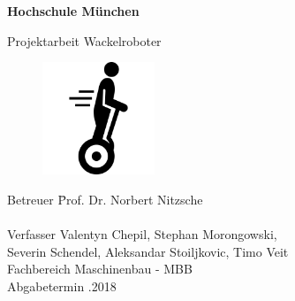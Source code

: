 
\begin{titlepage}
\thispagestyle{empty}
\begin{flushleft}
\begin{Huge}
\textbf{Hochschule München}
\par\medskip
Projektarbeit Wackelroboter
\end{Huge}
\begin{large}
\par\vspace{5cm}
\begin{figure}[h]
\centering\includegraphics[width=0.3\textwidth]{images/segwayIcon.png}

\end{figure}

\par\vspace{5cm}

\begin{large}
\begin{tabbing}
Betreuer \hspace{2cm}\= Prof. Dr. Norbert Nitzsche \\\\
Verfasser \> Valentyn Chepil, Stephan Morongowski, \\ \> Severin Schendel, Aleksandar Stoiljkovic, Timo Veit \\
Fachbereich \> Maschinenbau - MBB \\
Abgabetermin .2018

\end{tabbing}
\end{large}




\end{large}
\end{flushleft}


\vfill %
\end{titlepage}
\restoregeometry
